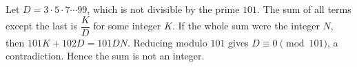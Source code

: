 Let $D=3\cdot5\cdot7\cdots99$, which is not divisible by the prime $101$. The sum of all terms except the last is $\dfrac{K}{D}$ for some integer $K$. If the whole sum were the integer $N$, then $101K+102D=101DN$. Reducing modulo $101$ gives $D\equiv0\pmod{101}$, a contradiction. Hence the sum is not an integer.
